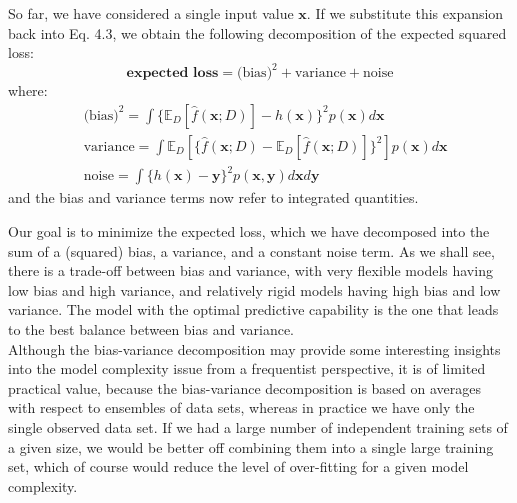 \documentclass[twoside]{article}
\begin{document}
So far, we have considered a single input value $\boldsymbol{x}$. If we substitute this expansion back into Eq. 4.3, we obtain the following decomposition of the expected squared loss:
\begin{equation*}
    \textbf{expected loss} = \text{(bias)}^2 + \text{variance} + \text{noise}
\end{equation*}
where:
\begin{equation*}
\begin{aligned}
    &\text{(bias)}^2 = \int \{\mathbb{E}_D[\hat{f}(\boldsymbol{x}; D)] - h(\boldsymbol{x})\}^2 p(\boldsymbol{x})d\boldsymbol{x}\\
    &\text{variance} = \int \mathbb{E}_D[\{\hat{f}(\boldsymbol{x}; D) - \mathbb{E}_D[\hat{f}(\boldsymbol{x}; D)]\}^2] p(\boldsymbol{x})d\boldsymbol{x}\\
    &\text{noise} = \int\{ h(\boldsymbol{x}) - \boldsymbol{y}\}^2p(\boldsymbol{x}, \boldsymbol{y})d\boldsymbol{x}d\boldsymbol{y}
\end{aligned}
\end{equation*}
and the bias and variance terms now refer to integrated quantities.\medskip

Our goal is to minimize the expected loss, which we have decomposed into the sum of a (squared) bias, a variance, and a constant noise term. As we shall see, there is a trade-off between bias and variance, with very flexible models having low bias and high variance, and relatively rigid models having high bias and low variance. The model with the optimal predictive capability is the one that leads to the best balance between bias and variance.\\
Although the bias-variance decomposition may provide some interesting insights into the model complexity issue from a frequentist perspective, it is of limited practical value, because the bias-variance decomposition is based on averages with respect to ensembles of data sets, whereas in practice we have only the single observed data set. If we had a large number of independent training sets of a given size, we would be better off combining them into a single large training set, which of course would reduce the level of over-fitting for a given model complexity.
\end{document}
